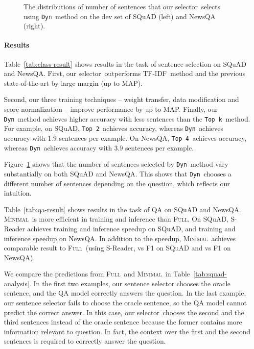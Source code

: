 \documentclass[11pt,a4paper]{article}
\newcommand{\topk}{{\tt Top k}}
\newcommand{\dyn}{{\tt Dyn}}
\newcommand{\toptwo}{{\tt Top 2}}
\newcommand{\topfour}{{\tt Top 4}}
\newcommand{\full}{\textsc{Full}}
\newcommand{\ours}{\textsc{Minimal}}
\newcommand{\tfidf}{TF-IDF}
\newcommand{\ourselector}{our selector}
\begin{document}
\begin{figure}[!ht]
\centering
{}
\caption{
The distributions of number of sentences that \ourselector~selects using \dyn~method on the dev set of SQuAD (left) and NewsQA (right).
}
\label{fig:num-of-sentences}
\end{figure}


\paragraph{Results}
Table~\ref{tab:class-result} shows results in the task of sentence selection on SQuAD and NewsQA.
First, \ourselector~outperforms \tfidf~method and the previous state-of-the-art by large margin (up to  MAP).


Second, our three training techniques -- weight transfer, data modification and score normalization -- improve performance by up to  MAP. 
Finally, our \dyn~method achieves higher accuracy with less sentences than the \topk~method.
For example, on SQuAD, \toptwo~achieves  accuracy, whereas \dyn~achieves  accuracy with 1.9 sentences per example.
On NewsQA, \topfour~achieves  accuracy, whereas \dyn~achieves  accuracy with 3.9 sentences per example. 

Figure~\ref{fig:num-of-sentences} shows that the number of sentences selected by \dyn~method vary substantially on both SQuAD and NewsQA.
This shows that \dyn~chooses a different number of sentences depending on the question, which reflects our intuition.


Table~\ref{tab:qa-result} shows results in the task of QA on SQuAD and NewsQA.
\ours~is more efficient in training and inference than \full.
On SQuAD, S-Reader achieves  training and  inference speedup on SQuAD, and  training and  inference speedup on NewsQA.
In addition to the speedup, \ours~achieves comparable result to \full~(using S-Reader,  vs  F1 on SQuAD and  vs  F1 on NewsQA).

We compare the predictions from \full~and \ours~in Table~\ref{tab:squad-analysis}.
In the first two examples, our sentence selector chooses the oracle sentence, and the QA model correctly answers the question.
In the last example, our sentence selector fails to choose the oracle sentence, so the QA model cannot predict the correct answer. 
In this case, \ourselector~chooses the second and the third sentences instead of the oracle sentence because the former contains more information relevant to question. In fact, the context over the first and the second sentences is required to correctly answer the question.
\end{document}
